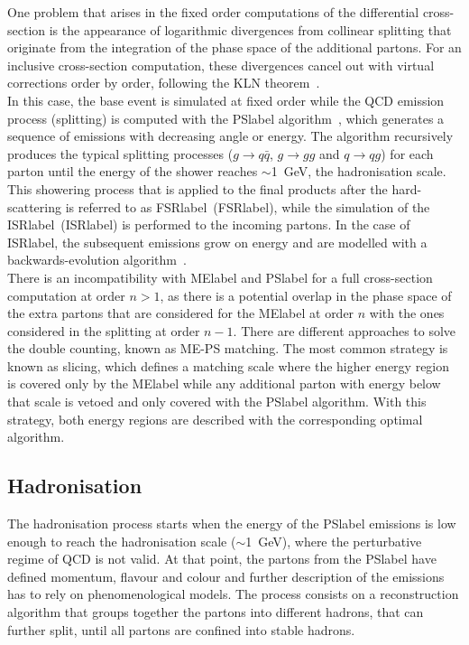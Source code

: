 One problem that arises in the fixed order computations of the differential cross-section is the appearance of logarithmic divergences from collinear splitting that originate from the integration of the phase space of the additional partons. For an inclusive cross-section computation, these divergences cancel out with virtual corrections order by order, following the KLN theorem~\cite{Masssingularities,PhysRev.133.B1549}.\\

In this case, the base event is simulated at fixed order while the \acrshort{QCD} emission process (splitting) is computed with the \acrshort{PSlabel} algorithm~\cite{FOX1980285}, 
which generates a sequence of emissions with decreasing angle or energy. The algorithm recursively produces the typical splitting processes ($g\to q\bar{q}$, $g\to gg$ and $q\to qg$) for each parton until the energy of the shower reaches $\sim$1~GeV, the hadronisation scale. This showering process that is applied to the final products after the hard-scattering is referred to as \acrlong{FSRlabel}~(\acrshort{FSRlabel}), while the simulation of the \acrlong{ISRlabel}~(\acrshort{ISRlabel}) is performed to the incoming partons. In the case of \acrshort{ISRlabel}, the subsequent emissions grow on energy and are modelled with a backwards-evolution algorithm~\cite{SJOSTRAND1985321}.\\

There is an incompatibility with \acrshort{MElabel} and \acrshort{PSlabel} for a full cross-section computation at order $n>1$, as there is a potential overlap in the phase space of the extra partons that are considered for the \acrshort{MElabel} at order $n$ with the ones considered in the splitting at order $n-1$. There are different approaches to solve the double counting, known as ME-PS matching. The most common strategy is known as slicing, which defines a matching scale where the higher energy region is covered only by the \acrshort{MElabel} while any additional parton with energy below that scale is vetoed and only covered with the \acrshort{PSlabel} algorithm. With this strategy, both energy regions are described with the corresponding optimal algorithm.

\subsection{Hadronisation}

The hadronisation process starts when the energy of the \acrshort{PSlabel} emissions is low enough to reach the hadronisation scale ($\sim$1~GeV), where the perturbative regime of \acrshort{QCD} is not valid. At that point, the partons from the \acrshort{PSlabel} have defined momentum, flavour and colour and further description of the emissions has to rely on phenomenological models. The process consists on a reconstruction algorithm that groups together the partons into different hadrons, that can further split, until all partons are confined into stable hadrons.\\

